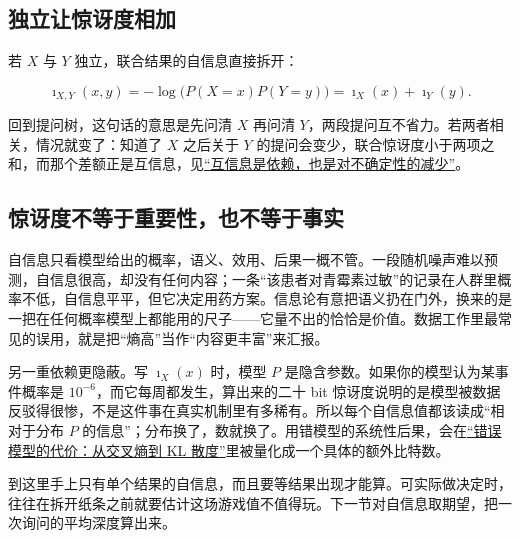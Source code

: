 \subsection{独立让惊讶度相加}

若 \(X\) 与 \(Y\) 独立，联合结果的自信息直接拆开：

\[
\imath_{X,Y}(x,y)=-\log\bigl(P(X=x)P(Y=y)\bigr)=\imath_X(x)+\imath_Y(y).
\]

回到提问树，这句话的意思是先问清 \(X\) 再问清 \(Y\)，两段提问互不省力。若两者相关，情况就变了：知道了 \(X\) 之后关于 \(Y\) 的提问会变少，联合惊讶度小于两项之和，而那个差额正是互信息，见\hyperref[sec:07-Information-Theory/02-Joint-Information/02]{``互信息是依赖，也是对不确定性的减少''}。

\subsection{惊讶度不等于重要性，也不等于事实}

自信息只看模型给出的概率，语义、效用、后果一概不管。一段随机噪声难以预测，自信息很高，却没有任何内容；一条``该患者对青霉素过敏''的记录在人群里概率不低，自信息平平，但它决定用药方案。信息论有意把语义扔在门外，换来的是一把在任何概率模型上都能用的尺子——它量不出的恰恰是价值。数据工作里最常见的误用，就是把``熵高''当作``内容更丰富''来汇报。

另一重依赖更隐蔽。写 \(\imath_X(x)\) 时，模型 \(P\) 是隐含参数。如果你的模型认为某事件概率是 \(10^{-6}\)，而它每周都发生，算出来的二十 bit 惊讶度说明的是模型被数据反驳得很惨，不是这件事在真实机制里有多稀有。所以每个自信息值都该读成``相对于分布 \(P\) 的信息''；分布换了，数就换了。用错模型的系统性后果，会在\hyperref[sec:07-Information-Theory/03-Divergences/01]{``错误模型的代价：从交叉熵到 KL 散度''}里被量化成一个具体的额外比特数。

到这里手上只有单个结果的自信息，而且要等结果出现才能算。可实际做决定时，往往在拆开纸条之前就要估计这场游戏值不值得玩。下一节对自信息取期望，把一次询问的平均深度算出来。
